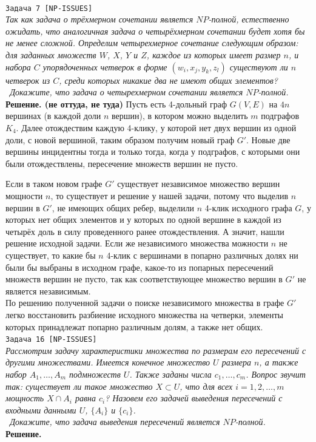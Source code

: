 \documentclass[10pt]{article}
\begin{document}
\ \\[0.5 cm]
{\large\texttt{Задача 7 [NP-ISSUES]}}
\ \\[0.2cm]
\textit{
Так как задача о трёхмерном сочетании является $NP$-полной, естественно ожидать, что аналогичная задача о четырёхмерном сочетании будет хотя бы не менее сложной. Определим четырехмерное сочетание следующим образом: для заданных множеств $W$, $X$, $Y$ и $Z$, каждое из которых имеет размер $n$, и набора $C$ упорядоченных четверок в форме $(w_i, x_j, y_k , z_l)$ существуют ли $n$ четверок из $C$, среди которых никакие два не имеют общих элементов?
\\ \
Докажите, что задача о четырехмерном сочетании является $NP$-полной.
}
\ \\[0.2cm]
\textbf{Решение. (не оттуда, не туда)} Пусть есть 4-дольный граф $G(V,E)$ на $4n$ вершинах (в каждой доли $n$ вершин), в котором можно выделить $m$ подграфов $K_4$. Далее отождествим каждую 4-клику, у которой нет двух вершин из одной доли, с новой вершиной, таким образом получим новый граф $G'$. Новые две вершины инцидентны тогда и только тогда, когда у подграфов, с которыми они были отождествлены, пересечение множеств вершин не пусто.
\medskip\par
Если в таком новом графе $G'$ существует независимое множество вершин мощности $n$, то существует и решение у нашей задачи, потому что выделив $n$ вершин в $G'$, не имеющих общих ребер, выделили $n$ 4-клик исходного графа $G$, у которых нет общих элементов и у которых по одной вершине в каждой из четырёх доль в силу проведенного ранее отождествления. А значит, нашли решение исходной задачи. Если же независимого множества можности $n$ не существует, то какие бы $n$ 4-клик с вершинами в попарно различных долях ни были бы выбраны в исходном графе, какое-то из попарных пересечений множеств вершин не пусто, так как соответствующее множество вершин в $G'$ не является независимым.
\ \\[0.1cm]
По решению полученной задачи о поиске независимого множества в графе $G'$ легко восстановить разбиение исходного множества на четверки, элементы которых принадлежат попарно различным долям, а также нет общих.
\ \\[0.5 cm]
{\large\texttt{Задача 16 [NP-ISSUES]}}
\ \\[0.2cm]
\textit{Рассмотрим задачу характеристики множества по размерам его пересечений
с другими множествами. Имеется конечное множество $U$ размера $n$, а также
набор $A_1, \dots, A_m$ подмножеств $U$. Также заданы числа $c_1, \dots, c_m$. Вопрос звучит так: существует ли такое множество $X\subset U$, что для всех $i = 1, 2, \dots, m$ мощность $X \cap A_i$ равна $c_i$? Назовем его задачей выведения пересечений с входными данными $U$, $\{A_i\}$ и $\{c_i\}$.
\\ \
Докажите, что задача выведения пересечений является $NP$-полной.
}
\ \\[0.2cm]
\textbf{Решение.} 
\end{document}
